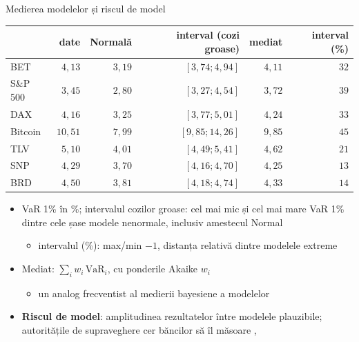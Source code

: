 \begin{frame}{Medierea modelelor și riscul de model}
\itemsize{\footnotesize}
\begin{center}
\scriptsize
\begin{tabular}{lrrrrr}
\toprule
& date & Normală & interval (cozi groase) & mediat & interval (\%) \\
\midrule
BET & $4{,}13$ & $3{,}19$ & $[3{,}74; 4{,}94]$ & $4{,}11$ & $32$ \\
S\&P 500 & $3{,}45$ & $2{,}80$ & $[3{,}27; 4{,}54]$ & $3{,}72$ & $39$ \\
DAX & $4{,}16$ & $3{,}25$ & $[3{,}77; 5{,}01]$ & $4{,}24$ & $33$ \\
Bitcoin & $10{,}51$ & $7{,}99$ & $[9{,}85; 14{,}26]$ & $9{,}85$ & $45$ \\
TLV & $5{,}10$ & $4{,}01$ & $[4{,}49; 5{,}41]$ & $4{,}62$ & $21$ \\
SNP & $4{,}29$ & $3{,}70$ & $[4{,}16; 4{,}70]$ & $4{,}25$ & $13$ \\
BRD & $4{,}50$ & $3{,}81$ & $[4{,}18; 4{,}74]$ & $4{,}33$ & $14$ \\
\bottomrule
\end{tabular}
\end{center}
\begin{itemize}
    \item VaR 1\% în \%; intervalul cozilor groase: cel mai mic și cel mai mare VaR 1\% dintre cele șase modele nenormale, inclusiv amestecul Normal
    \begin{itemize}
        \item intervalul (\%): max/min $- 1$, distanța relativă dintre modelele extreme
    \end{itemize}
    \item Mediat: $\sum_i w_i\,\mathrm{VaR}_i$, cu ponderile Akaike $w_i$
    \begin{itemize}
        \item un analog frecventist al medierii bayesiene a modelelor 
    \end{itemize}
    \item \textbf{Riscul de model}: amplitudinea rezultatelor între modelele plauzibile; autoritățile de supraveghere cer băncilor să îl măsoare , 
\end{itemize}
\end{frame}

